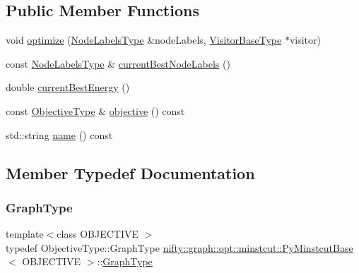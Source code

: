 \subsection*{Public Member Functions}
\begin{DoxyCompactItemize}
\item 
void \hyperlink{classnifty_1_1graph_1_1opt_1_1minstcut_1_1PyMinstcutBase_aaa5f5dfa5146cfb49e2eca5042b88a73}{optimize} (\hyperlink{classnifty_1_1graph_1_1opt_1_1minstcut_1_1PyMinstcutBase_a9bec148d1b9938c8bb61fc079addda6f}{Node\+Labels\+Type} \&node\+Labels, \hyperlink{classnifty_1_1graph_1_1opt_1_1minstcut_1_1PyMinstcutBase_ab9d7b03bc4b7359bde367f0613964ede}{Visitor\+Base\+Type} $\ast$visitor)
\item 
const \hyperlink{classnifty_1_1graph_1_1opt_1_1minstcut_1_1PyMinstcutBase_a9bec148d1b9938c8bb61fc079addda6f}{Node\+Labels\+Type} \& \hyperlink{classnifty_1_1graph_1_1opt_1_1minstcut_1_1PyMinstcutBase_a322ab20f3c292bf2e1958eb87d9af1a5}{current\+Best\+Node\+Labels} ()
\item 
double \hyperlink{classnifty_1_1graph_1_1opt_1_1minstcut_1_1PyMinstcutBase_aa67fa470882e305a5a38277ed73d1a3b}{current\+Best\+Energy} ()
\item 
const \hyperlink{classnifty_1_1graph_1_1opt_1_1minstcut_1_1PyMinstcutBase_acadf3b778a5c31979914063a2603223c}{Objective\+Type} \& \hyperlink{classnifty_1_1graph_1_1opt_1_1minstcut_1_1PyMinstcutBase_a65b92486f4d6cb8e5d2e5b12ba4623e2}{objective} () const
\item 
std\+::string \hyperlink{classnifty_1_1graph_1_1opt_1_1minstcut_1_1PyMinstcutBase_a2987a843afc3fd9f53333e4fbed08aad}{name} () const
\end{DoxyCompactItemize}


\subsection{Member Typedef Documentation}
\mbox{\label{classnifty_1_1graph_1_1opt_1_1minstcut_1_1PyMinstcutBase_abc84a9ebd6fbe5cbbe7049c4da44009e}} 
\subsubsection{\texorpdfstring{Graph\+Type}{GraphType}}
{\footnotesize\ttfamily template$<$class O\+B\+J\+E\+C\+T\+I\+VE $>$ \\
typedef Objective\+Type\+::\+Graph\+Type \hyperlink{classnifty_1_1graph_1_1opt_1_1minstcut_1_1PyMinstcutBase}{nifty\+::graph\+::opt\+::minstcut\+::\+Py\+Minstcut\+Base}$<$ O\+B\+J\+E\+C\+T\+I\+VE $>$\+::\hyperlink{classnifty_1_1graph_1_1opt_1_1minstcut_1_1PyMinstcutBase_abc84a9ebd6fbe5cbbe7049c4da44009e}{Graph\+Type}}

